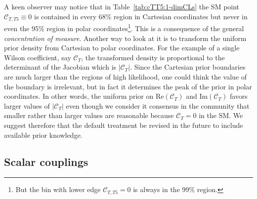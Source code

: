\documentclass[twocolumn,epjc3]{svjour3}
\numberwithin{equation}{section}
\def \reftab#1{Table~\ref{#1}}
\newcommand{\wilson}[2][{}]{\mathcal{C}_{#2}^{\mathrm{#1}}}
\renewcommand{\[}{\big[}
\renewcommand{\]}{\big]}
\renewcommand{\(}{\big(}
\renewcommand{\)}{\big)}
\begin{document}
A keen observer may notice that in \reftab{tab:cTT5:1-dimCLs} the SM point
$\wilson{T,T5} \equiv 0$ is contained in every 68\% region in Cartesian
coordinates but never in even the 95\% region in polar coordinates\footnote{But
  the bin with lower edge $\wilson{T,T5} = 0$ is always in the 99\%
  region.}. This is a consequence of the general \emph{concentration of
  measure}. Another way to look at it is to transform the uniform prior density
from Cartesian to polar coordinates. For the example of a single Wilson
coefficient, say $\wilson{T}$, the transformed density is proportional to the
determinant of the Jacobian which is $|\wilson{T}|$. Since the Cartesian prior
boundaries are much larger than the regions of high likelihood, one could think
the value of the boundary is irrelevant, but in fact it determines the peak of
the prior in polar coordinates. In other words, the uniform prior on
$\mbox{Re}(\wilson{T})$ and $\mbox{Im}(\wilson{T})$ favors larger values of
$|\wilson{T}|$ even though we consider it consensus in the community that
smaller rather than larger values are reasonable because $\wilson{T} = 0$ in the
SM. We suggest therefore that the default treatment be revised in the future to
include available prior knowledge.

%
%
\subsection{Scalar couplings \label{sec:scalar}}
\end{document}
